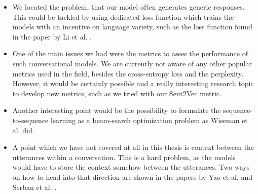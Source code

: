 \begin{itemize}
  \item We located the problem, that our model often generates generic responses. This could be tackled by using dedicated loss function which trains the models with an incentive on language variety, such as the loss function found in the paper by Li et al. \cite{Li:2016}.

  \item One of the main issues we had were the metrics to asses the performance of such conversational models. We are currently not aware of any other popular metrics used in the field, besides the cross-entropy loss and the perplexity. However, it would be certainly possible and a really interesting research topic to develop new metrics, such as we tried with our Sent2Vec metric.

  \item Another interesting point would be the possibility to formulate the sequence-to-sequence learning as a beam-search optimization problem as Wiseman et al. \cite{Wiseman:2016} did.

  \item A point which we have not covered at all in this thesis is context between the utterances within a conversation. This is a hard problem, as the models would have to store the context somehow between the utterances. Two ways on how to head into that direction are shown in the papers by Yao et al. \cite{Yao:2015} and Serban et al. \cite{Serban:2015}.
\end{itemize}
